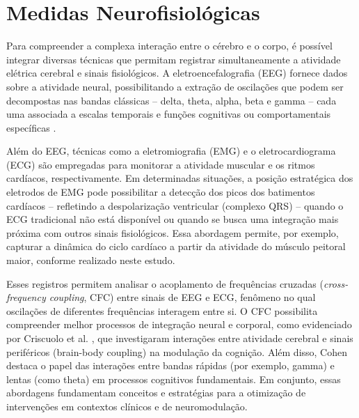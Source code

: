 \section{Medidas Neurofisiológicas}
Para compreender a complexa interação entre o cérebro e o corpo, é possível integrar diversas técnicas que permitam registrar simultaneamente a atividade elétrica cerebral e sinais fisiológicos. A eletroencefalografia (EEG) fornece dados sobre a atividade neural, possibilitando a extração de oscilações que podem ser decompostas nas bandas clássicas – delta, theta, alpha, beta e gamma – cada uma associada a escalas temporais e funções cognitivas ou comportamentais específicas \cite{cohen2017where, bullmore2009complex}.

Além do EEG, técnicas como a eletromiografia (EMG) e o eletrocardiograma (ECG) são empregadas para monitorar a atividade muscular e os ritmos cardíacos, respectivamente. Em determinadas situações, a posição estratégica dos eletrodos de EMG pode possibilitar a detecção dos picos dos batimentos cardíacos – refletindo a despolarização ventricular (complexo QRS) – quando o ECG tradicional não está disponível ou quando se busca uma integração mais próxima com outros sinais fisiológicos. Essa abordagem permite, por exemplo, capturar a dinâmica do ciclo cardíaco a partir da atividade do músculo peitoral maior, conforme realizado neste estudo.

Esses registros permitem analisar o acoplamento de frequências cruzadas (\textit{cross-frequency coupling}, CFC) entre sinais de EEG e ECG, fenômeno no qual oscilações de diferentes frequências interagem entre si. O CFC possibilita compreender melhor processos de integração neural e corporal, como evidenciado por Criscuolo et al. \cite{criscuolo2022cognition}, que investigaram interações entre atividade cerebral e sinais periféricos (brain-body coupling) na modulação da cognição. Além disso, Cohen \cite{cohen2017where} destaca o papel das interações entre bandas rápidas (por exemplo, gamma) e lentas (como theta) em processos cognitivos fundamentais. Em conjunto, essas abordagens fundamentam conceitos e estratégias para a otimização de intervenções em contextos clínicos e de neuromodulação.